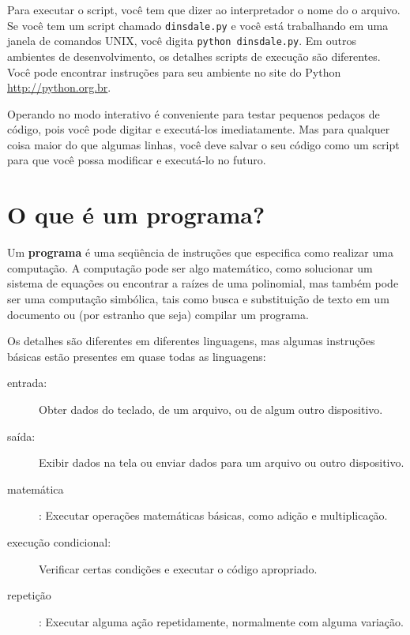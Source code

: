 \documentclass[10pt]{book}
\begin{document}
Para executar o script, você tem que dizer ao interpretador o nome do
o arquivo. Se você tem um script chamado {\tt dinsdale.py} e você está
trabalhando em uma janela de comandos UNIX, você digita {\tt python
dinsdale.py}. Em outros ambientes de desenvolvimento, os detalhes
scripts de execução são diferentes. Você pode encontrar instruções para
seu ambiente no site do Python \url{http://python.org.br}.

Operando no modo interativo é conveniente para testar pequenos pedaços de
código, pois você pode digitar e executá-los imediatamente. Mas para
qualquer coisa maior do que algumas linhas, você deve salvar o seu código
como um script para que você possa modificar e executá-lo no futuro.


\section{O que é um programa?}

Um {\bf programa} é uma seqüência de instruções que especifica como
realizar uma computação. A computação pode ser algo
matemático, como solucionar um sistema de equações ou encontrar a
raízes de uma polinomial, mas também pode ser uma computação simbólica, tais
como busca e substituição de texto em um documento ou (por estranho que seja)
compilar um programa.

Os detalhes são diferentes em diferentes linguagens, mas algumas instruções
básicas estão presentes em quase todas as linguagens:

\begin{description}

\item[entrada:] Obter dados do teclado, de um arquivo, ou de algum
outro dispositivo.

\item[saída:] Exibir dados na tela ou enviar dados para um
arquivo ou outro dispositivo.

\item[matemática]: Executar operações matemáticas básicas, como adição e
multiplicação.

\item[execução condicional:] Verificar certas condições e
executar o código apropriado.

\item[repetição]: Executar alguma ação repetidamente, normalmente com
alguma variação.

\end{description}
\end{document}
